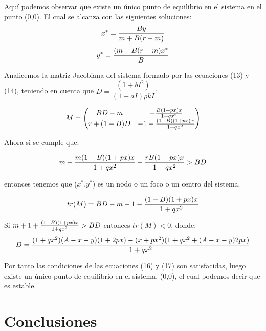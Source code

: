 \documentclass{article}
\begin{document}
Aqu\'i podemos observar que existe un \'unico punto de equilibrio en el sistema en el punto (0,0). El cual se alcanza con las siguientes soluciones: $$x^*={By\over m+B(r-m)}$$ $$y^*={(m+B(r-m)x^*\over B}$$

Analicemos la matriz Jacobiana del sistema formado por las ecuaciones (13) y (14), teniendo en cuenta que $D = \dfrac{(1+bI^2)}{(1+aI)\rho kI}$:

\begin{equation}
	M=\left(
	\begin{matrix}
		 BD-m & -{B(1+px)x\over 1+qx^2}\\
		 r+(1-B)D & -1-{(1-B)(1+px)x\over 1+qx^2}
	\end{matrix}
	\right)
\end{equation}

Ahora si se cumple que:

\begin{equation}
m+{m(1-B)(1+px)x\over 1+qx^2}+{rB(1+px)x\over 1+qx^2}>BD
\end{equation}

entonces tenemos que ($x^*$,$y^*$) es un nodo o un foco o un centro del sistema.

\begin{equation}
	tr(M)=BD-m-1-{(1-B)(1+px)x\over 1+qx^2}
\end{equation}

Si $m+1+{(1-B)(1+px)x\over 1+qx^2}>BD$ entonces $tr(M)<0$, donde:
$$D={(1+qx^2)(A-x-y)(1+2px)-(x+px^2)(1+qx^2+(A-x-y)2px)\over 1+qx^2}$$

Por tanto las condiciones de las ecuaciones (16) y (17) son satisfacidas, luego existe un \'unico punto de equilibrio en el sistema, (0,0), el cual podemos decir que es estable. 
	
\section{Conclusiones}
\end{document}
